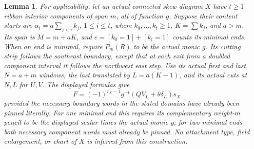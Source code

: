 \documentclass[11pt,a4paper]{amsart}
\numberwithin{equation}{section}
\theoremstyle{plain}
\newtheorem{lemma}[theorem]{Lemma}
\theoremstyle{definition}
\begin{document}
\begin{lemma}
For applicability, let an actual connected skew diagram \(X\) have \(t\ge1\)
ribbon interior components of span \(m\), all of function \(g\).  Suppose their
content starts are
\(\alpha_i=a\sum_{j<i}k_j\), \(1\le i\le t\), where
\(k_0,\ldots,k_t\ge1\), \(K=\sum k_j\), and \(a>m\).
Its span is \(M=m+aK\), and
\(e=[k_0=1]+[k_t=1]\) counts its minimal ends.
When an end is minimal, require \(P_m(R)\) to be the actual monic \(g\).
Its cutting strip follows the southeast boundary,
except that at each exit from a doubled component interval it follows the
northwest east step.  Use its actual first and last \(N=a+m\) windows, the
last translated by \(L=a(K-1)\), and its actual cuts at \(N,L\) for \(U,V\).
The displayed formulas give
\[
 F=(-1)^{r_X-1}g^{-t}(QV_L+\theta\delta_L)s_X
\]
provided the necessary boundary words in the stated domains have already
been pinned literally.  For one minimal end this requires its complementary
weight-\(m\) pencil to be the displayed scalar times the actual monic
\(g\); for two minimal ends both necessary component words must already be
pinned.  No attachment type, field enlargement, or chart of \(X\) is inferred
from this construction.
\end{lemma}
\end{document}

